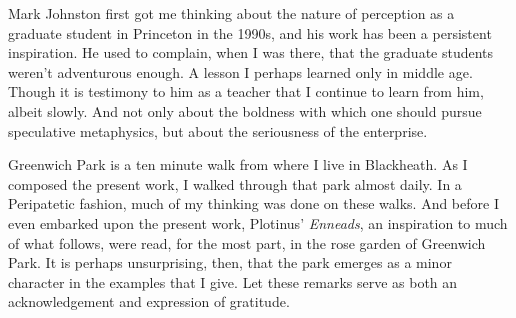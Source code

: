 Mark Johnston first got me thinking about the nature of perception as a graduate student in Princeton in the 1990s, and his work has been a persistent inspiration. He used to complain, when I was there, that the graduate students weren't adventurous enough. A lesson I perhaps learned only in middle age. Though it is testimony to him as a teacher that I continue to learn from him, albeit slowly. And not only about the boldness with which one should pursue speculative metaphysics, but about the seriousness of the enterprise.

Greenwich Park is a ten minute walk from where I live in Blackheath. As I composed the present work, I walked through that park almost daily. In a Peripatetic fashion, much of my thinking was done on these walks. And before I even embarked upon the present work, Plotinus' \emph{Enneads}, an inspiration to much of what follows, were read, for the most part, in the rose garden of Greenwich Park. It is perhaps unsurprising, then, that the park emerges as a minor character in the examples that I give. Let these remarks serve as both an acknowledgement and expression of gratitude.  



